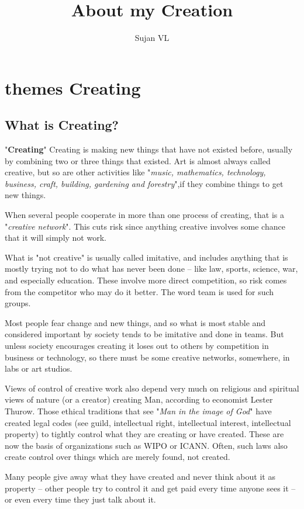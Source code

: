 \documentclass[6pt,a4paper]{report}
\author{Sujan VL}
\title{About my Creation}
\begin{document}
 
\maketitle 
\chapter{themes Creating} 
\section*{What is Creating?} 
"\textbf{Creating}" Creating is making new things that have not existed before, usually by combining two or three things that existed. Art is almost always called creative, but so are other activities like  "\textit{music, mathematics, technology, business, craft, building, gardening and forestry}",if they combine things to get new things.

When several people cooperate in more than one process of creating, that is a "\textit{creative network}". This cuts risk since anything creative involves some chance that it will simply not work.

What is "not creative" is usually called imitative, and includes anything that is mostly trying not to do what has never been done – like law, sports, science, war, and especially education. These involve more direct competition, so risk comes from the competitor who may do it better. The word team is used for such groups.

Most people fear change and new things, and so what is most stable and considered important by society tends to be imitative and done in teams. But unless society encourages creating it loses out to others by competition in business or technology, so there must be some creative networks, somewhere, in labs or art studios.

Views of control of creative work also depend very much on religious and spiritual views of nature (or a creator) creating Man, according to economist Lester Thurow. Those ethical traditions that see "\textit{Man in the image of God}" have created legal codes (see guild, intellectual right, intellectual interest, intellectual property) to tightly control what they are creating or have created. These are now the basis of organizations such as WIPO or ICANN. Often, such laws also create control over things which are merely found, not created.

Many people give away what they have created and never think about it as property – other people try to control it and get paid every time anyone sees it – or even every time they just talk about it.
\end{document}
